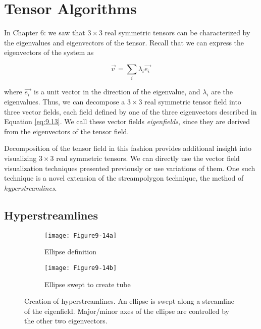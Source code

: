 \section{Tensor Algorithms}

In Chapter 6:  we saw that $3 \times 3$ real symmetric tensors can be characterized by the eigenvalues and eigenvectors of the tensor. Recall that we can express the eigenvectors of the system as

\begin{equation}\label{eq:9.13}
\overrightarrow{v\ } = \sum_i \lambda_i \overrightarrow{e_i\ }
\end{equation}

\noindent where $\overrightarrow{e_i\ }$ is a unit vector in the direction of the eigenvalue, and $\lambda_i$ are the eigenvalues. Thus, we can decompose a  $3 \times 3$ real symmetric tensor field into three vector fields, each field defined by one of the three eigenvectors described in Equation \ref{eq:9.13}. We call these vector fields \emph{eigenfields}, since they are derived from the eigenvectors of the tensor field.

Decomposition of the tensor field in this fashion provides additional insight into visualizing $3 \times 3$ real symmetric tensors. We can directly use the vector field visualization techniques presented previously or use variations of them. One such technique is a novel extension of the streampolygon technique, the method of \emph{hyperstreamlines}.

\subsection{Hyperstreamlines}

\begin{figure}[htb]
	\begin{subfigure}[h]{0.48\linewidth}
		\texttt{[image: Figure9-14a]}
		\captionsetup{justification=centering}
		\caption{Ellipse definition}
		\label{fig:Figure9-14a}
	\end{subfigure}
	\hfill
	\begin{subfigure}[h]{0.48\linewidth}
		\texttt{[image: Figure9-14b]}
		\captionsetup{justification=centering}
		\caption{Ellipse swept to create tube}
		\label{fig:Figure9-14b}
	\end{subfigure}
	\caption{Creation of hyperstreamlines. An ellipse is swept along a streamline of the eigenfield. Major/minor axes of the ellipse are controlled by the other two eigenvectors.}\label{fig:Figure9-14}
\end{figure}

